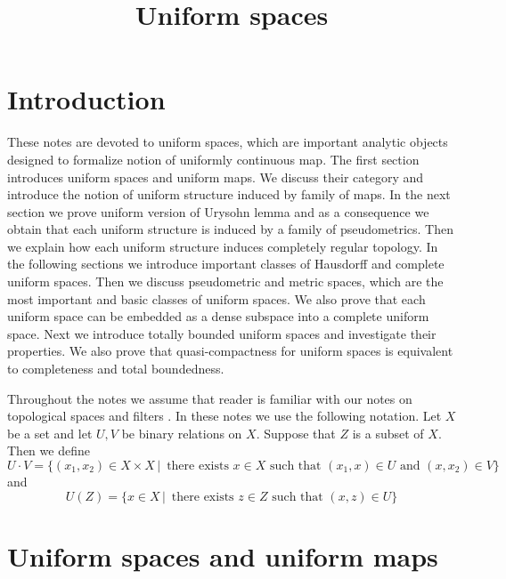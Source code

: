 


\title{Uniform spaces}
\date{}
\maketitle

\section{Introduction}
\noindent
These notes are devoted to uniform spaces, which are important analytic objects designed to formalize notion of uniformly continuous map. The first section introduces uniform spaces and uniform maps. We discuss their category and introduce the notion of uniform structure induced by family of maps. In the next section we prove uniform version of Urysohn lemma and as a consequence we obtain that each uniform structure is induced by a family of pseudometrics. Then we explain how each uniform structure induces completely regular topology. In the following sections we introduce important classes of Hausdorff and complete uniform spaces. Then we discuss pseudometric and metric spaces, which are the most important and basic classes of uniform spaces. We also prove that each uniform space can be embedded as a dense subspace into a complete uniform space. Next we introduce totally bounded uniform spaces and investigate their properties. We also prove that quasi-compactness for uniform spaces is equivalent to completeness and total boundedness. 

Throughout the notes we assume that reader is familiar with our notes on topological spaces \cite{Topological_spaces} and filters \cite{Filters_in_topology}. In these notes we use the following notation. Let $X$ be a set and let $U, V$ be binary relations on $X$. Suppose that $Z$ is a subset of $X$. Then we define
$$U \cdot V = \big\{(x_1,x_2) \in X\times X\,\big|\,\mbox{ there exists }x\in X\mbox{ such that }(x_1, x)\in U\mbox{ and }(x,x_2)\in V\big\}$$
and
$$U(Z) = \big\{x \in X\,\big|\,\mbox{ there exists }z\in Z\mbox{ such that }(x, z)\in U\big\}$$


\section{Uniform spaces and uniform maps}

